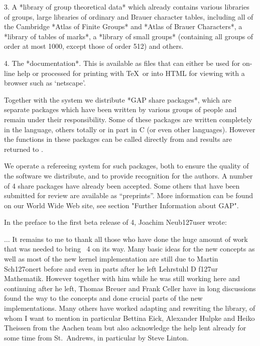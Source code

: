   \item{3.}  
    A *library of group theoretical data* which already contains
    various libraries of groups, large libraries of ordinary and
    Brauer  character tables,   including  all of the   Cambridge *Atlas of
    Finite Groups*  and *Atlas of Brauer Characters*,  a *library of tables
    of marks*, a *library of small groups* (containing  all groups of order
    at most 1000, except those of order 512) and others.


  \item{4.}
    The *documentation*.  This is available as files that can either be
    used for on-line  help or processed for printing with \TeX\ or into
    HTML for viewing with a browser such as `netscape'.
\endlist

Together  with the system we distribute  *GAP  share packages*, which are
separate packages which have been written by various groups of people and
remain  under their responsibility.  Some  of  these packages are written
completely in the {\GAP}  language, others totally   or in part in  C (or
even  other languages).  However the functions   in these packages can be
called directly from {\GAP} and results are returned to {\GAP}.

We  operate a refereeing  system  for such packages,  both  to ensure the
quality of the software we distribute, and to provide recognition for the
authors.    A  number of  {\GAP}   4  share   packages  have already been
accepted. Some others  that have been submitted  for review are available
as  ``preprints''. More information  can be found on   our World Wide Web
site, see section "Further Information about GAP".


In the preface to the first beta release of {\GAP} 4, Joachim Neub\accent127user wrote:

\begingroup\advance\leftskip 0.5in\advance\rightskip 0.5in

   $\ldots$  It remains to me to  thank all those  who have done the huge
   amount of work that  was needed to  bring  {\GAP}~4 on its  way.  Many
   basic ideas for  the new concepts as  well  as most of the  new kernel
   implementation are still due  to Martin Sch\accent127onert  before and
   even  in parts  after  he left  Lehrstuhl D  f\accent127ur Mathematik.
   However   together with  him  while   he  was still  working  here and
   continuing after he left, Thomas Breuer and  Frank Celler have in long
   discussions found  the way to  the concepts and  done crucial parts of
   the  new  implementations.   Many  others  have  worked  adapting  and
   rewriting the library, of whom I want to mention in particular Bettina
   Eick, Alexander  Hulpke and Heiko  Theissen  from the Aachen  team but
   also   acknowledge   the help  lent   already  for  some  time  from
   St.~Andrews, in particular by Steve Linton.


